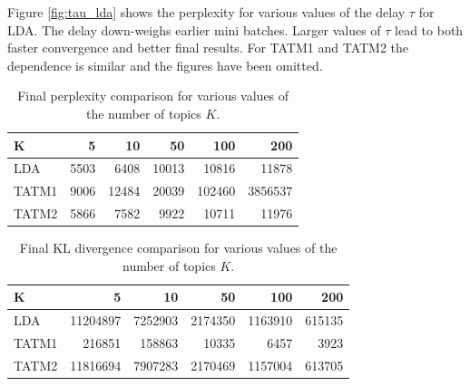 Figure \ref{fig:tau_lda} shows the perplexity for various values of the delay $\tau$ for LDA. The delay down-weighs earlier mini batches. Larger values of $\tau$ lead to both faster convergence and better final results. For TATM1 and TATM2 the dependence is similar and the figures have been omitted.
%
\begin{table}[h]
\centering
\begin{tabular}{l||r|r|r|r|r}
K	&5 &	10&	50	&100&	200 \\ \hline \hline 
LDA	&5503&	6408&	10013 &10816	&11878\\ \hline
TATM1&	9006	&12484&	20039&	102460&	3856537 \\ \hline
TATM2&	5866	&7582&	9922&	10711& 11976 \\
\end{tabular}
\caption{Final perplexity comparison for various values of the number of topics $K$.}
\label{tab:perplexity}
\end{table}
%
\begin{table}[h]
\centering
\begin{tabular}{l||r|r|r|r|r}
K	&5 &	10&	50	&100&	200 \\ \hline \hline 
LDA	&11204897	&7252903	&2174350	&1163910 &615135  \\ \hline
TATM1	&216851 &158863	&10335	&6457	&3923 \\ \hline
TATM2	&11816694	&7907283&	2170469	&1157004 &613705  \\
\end{tabular}
\caption{Final KL divergence comparison for various values of the number of topics $K$.}
\label{tab:kl}
\end{table}
%